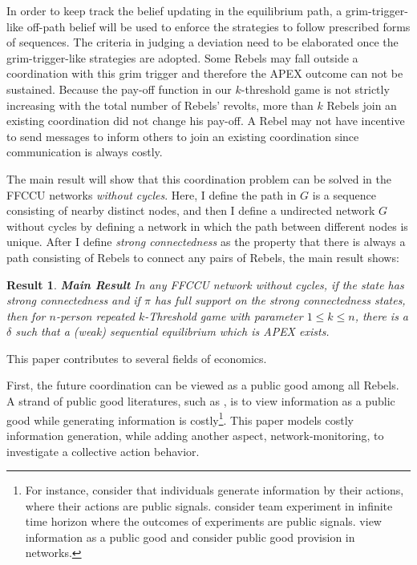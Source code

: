 \documentclass[12pt,letter]{article}
\newtheorem{result}{Result}
\theoremstyle{definition}
\theoremstyle{remark}
\theoremstyle{claim}
\begin{document}
In order to keep track the belief updating in the equilibrium path, a grim-trigger-like off-path belief will be used to enforce the strategies to follow prescribed forms of sequences. The criteria in judging a deviation need to be elaborated once the grim-trigger-like strategies are adopted. Some Rebels may fall outside a coordination with this grim trigger and therefore the APEX outcome can not be sustained. Because the pay-off function in our $k$-threshold game is not strictly increasing with the total number of Rebels' revolts, more than $k$ Rebels join an existing coordination did not change his pay-off. A Rebel may not have incentive to send messages to inform others to join an existing coordination since communication is always costly. 

The main result will show that this coordination problem can be solved in the FFCCU networks \textit{without cycles}. Here, I define the path in $G$ is a sequence consisting of nearby distinct nodes, and then I define a undirected network $G$ without cycles by defining a network in which the path between different nodes is unique. After I define \textit{strong connectedness} as the property that there is always a path consisting of Rebels to connect any pairs of Rebels,  the main result shows:

\begin{result}\textbf{Main Result}
In any FFCCU network without cycles, if the state has strong connectedness and if $\pi$ has full support on the strong connectedness states, then for $n$-person repeated $k$-Threshold game with parameter $1\leq k \leq n$, there is a $\delta$ such that a (weak) sequential equilibrium which is APEX exists.  
\end{result}




This paper contributes to several fields of economics. 

First, the future coordination can be viewed as a public good among all Rebels. A strand of public good literatures, such as \citep{Lohmann1994}, is to view information as a public good while generating information is costly\footnote{For instance, \citep{Lohmann1993}\citep{Lohmann1994} consider that individuals generate information by their actions, where their actions are public signals. \citep{Bolton1999} consider team experiment in infinite time horizon where the outcomes of experiments are public signals. \citep{Bramoulle2007} view information as a public good and consider public good provision in networks.}. This paper models costly information generation, while adding another aspect, network-monitoring, to investigate a collective action behavior.
\end{document}
